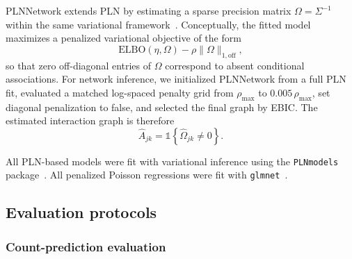 \documentclass[Review,doublespace,sageh,times]{sagej}
\begin{document}
PLNNetwork extends PLN by estimating a sparse precision matrix $\Omega = \Sigma^{-1}$ within the same variational framework~\citep{chiquet2019variational,Chiquet2021}.
Conceptually, the fitted model maximizes a penalized variational objective of the form
\[
\mathrm{ELBO}(\eta, \Omega) - \rho \lVert \Omega \rVert_{1,\mathrm{off}},
\]
so that zero off-diagonal entries of $\Omega$ correspond to absent conditional associations.
For network inference, we initialized PLNNetwork from a full PLN fit, evaluated a matched log-spaced penalty grid from $\rho_{\max}$ to $0.005\,\rho_{\max}$, set diagonal penalization to false, and selected the final graph by EBIC.
The estimated interaction graph is therefore
\[
\hat{A}_{jk} = \mathbb{1}\!\left\{\hat{\Omega}_{jk} \neq 0\right\}.
\]

All PLN-based models were fit with variational inference using the \texttt{PLNmodels} package~\citep{Chiquet2021}.
All penalized Poisson regressions were fit with \texttt{glmnet}~\citep{Friedman2010}.

\subsection{Evaluation protocols}
\label{subsec:evaluation-protocols}

\subsubsection{Count-prediction evaluation}
\end{document}
